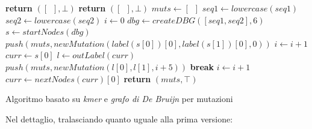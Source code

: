 \documentclass[a4paper,12pt, oneside]{book}
\begin{document}
\begin{algorithm}[H]
  \small
  \begin{algorithmic}[1]
    \State \textbf{return} $([\,\,\,],\bot)$
    \EndIf
    \State \textbf{return} $([\,\,\,],\bot)$
    \EndIf
    \State $muts \gets [\,\,\,]$
    \State $seq1\gets lowercase(seq1)$
    \State $seq2\gets lowercase(seq2)$
    \State $i\gets 0$
    \State $dbg\gets createDBG([seq1, seq2], 6)$
    \State $s \gets startNodes(dbg)$
    \State $push(muts, newMutation(label(s[0])[0], label(s[1])[0], 0))$ 
    \State $i\gets i+1$
    \EndIf
    \State $curr\gets s[0]$
    \While {$\top$}
    \State $l\gets outLabel(curr)$
    \State $push(muts, newMutation(l[0],l[1], i+5))$
    \EndIf
    \State \textbf{break}
    \EndIf
    \State $i\gets i+1$
    \State $curr\gets nextNodes(curr)[0]$
    \EndWhile
    \State \textbf{return} $(muts, \top)$
    \EndFunction
  \end{algorithmic}
  \caption{Algoritmo basato su \textit{kmer} e \textit{grafo di De Bruijn} per
  mutazioni} 
\end{algorithm}
Nel dettaglio, tralasciando quanto uguale alla prima versione:
\end{document}
